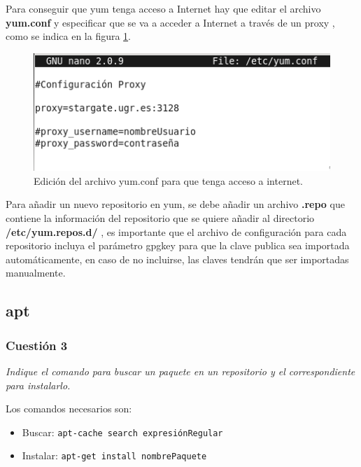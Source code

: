 Para conseguir que yum tenga acceso a Internet hay que editar el archivo \textbf{yum.conf} y especificar que se va a acceder a Internet a través de un proxy , como se indica en la figura \ref{fig41}. \cite{centosproxy}

\begin{figure}[H]
    \begin{center}
        \includegraphics[scale=0.8]{imagenes/img44}
        \caption{Edición del archivo yum.conf para que tenga acceso a internet.}
        \label{fig41}
    \end{center}
\end{figure}


Para añadir un nuevo repositorio en yum, se debe añadir un archivo \textbf{.repo} que contiene la información del repositorio que se quiere añadir al directorio \textbf{/etc/yum.repos.d/} , es importante que el archivo de configuración para cada repositorio incluya el parámetro gpgkey para que la clave publica sea importada automáticamente, en caso de no incluirse, las claves tendrán que ser importadas manualmente. \cite{centosadd}
\subsection{apt}



\subsubsection{Cuestión 3}
\textit{Indique el comando para buscar un paquete en un repositorio y el correspondiente para instalarlo.}
\newline

Los comandos necesarios son: \cite{manapt1} \cite{manapt2}
\begin{itemize}
  \item Buscar: \texttt{apt-cache search expresiónRegular }
  \item Instalar: \texttt{apt-get install nombrePaquete}
\end{itemize}




